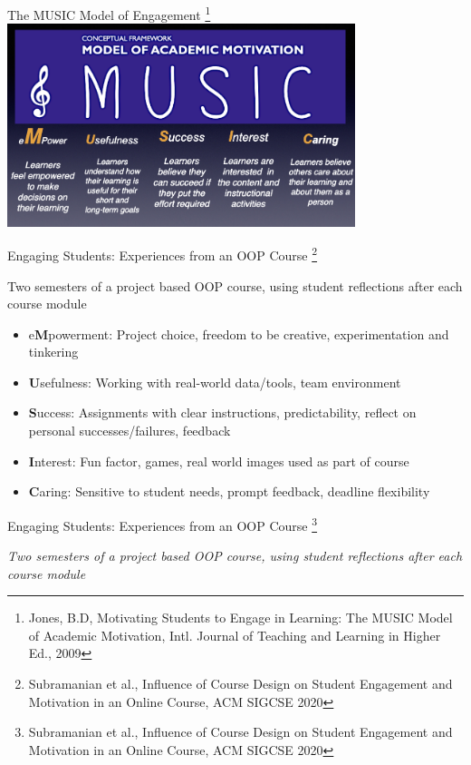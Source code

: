 \documentclass[aspectratio=169]{beamer}
\begin{document}
\begin{frame}{The MUSIC Model of Engagement}
\footnote{ Jones, B.D, Motivating Students to Engage in Learning: The MUSIC Model of Academic Motivation, Intl. Journal of Teaching and Learning in Higher Ed., 2009}
\centering\includegraphics[width=4in]{figs/music_model.png}
\end{frame}
\begin{frame}{Engaging Students: Experiences from an OOP Course
\footnote{Subramanian et al., Influence of Course Design on Student Engagement and Motivation in an Online Course, ACM SIGCSE 2020}}
\begin{block}{Two semesters of a project based OOP course, using
student  reflections after each course module}
\end{block}
\begin{itemize} 
	\item e\textbf{M}powerment: Project choice, freedom to be creative, 
		experimentation and tinkering
	\item \textbf{U}sefulness: Working with real-world data/tools, team
		environment
	\item \textbf{S}uccess: Assignments with clear instructions, predictability,
		reflect on personal successes/failures, feedback
	\item \textbf{I}nterest: Fun factor,  games, real world images used
		as part of course
	\item \textbf{C}aring: Sensitive to student needs, prompt feedback, deadline
		flexibility
\end{itemize}
\end{frame}
\begin{frame}{Engaging Students: Experiences from an OOP Course
\footnote{Subramanian et al., Influence of Course Design on Student Engagement and Motivation in an Online Course, ACM SIGCSE 2020}}
\begin{block}{\sl Two semesters of a project based OOP course, using
student  reflections after each course module}
\end{block}
\end{frame}
\end{document}
